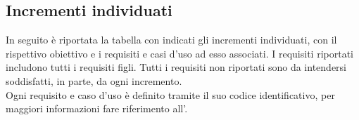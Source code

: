 
\subsection{Incrementi individuati} \label{subsection:incrementi}
In seguito è riportata la tabella con indicati gli incrementi individuati, con il rispettivo obiettivo e i requisiti e casi d'uso ad esso associati. 
I requisiti riportati includono tutti i requisiti figli. Tutti i requisiti non riportati sono da intendersi soddisfatti, in parte, da 
ogni incremento. \\
Ogni requisito e caso d'uso è definito tramite il suo codice identificativo, per maggiori informazioni fare riferimento all'\docNameVersionAdR{}.

